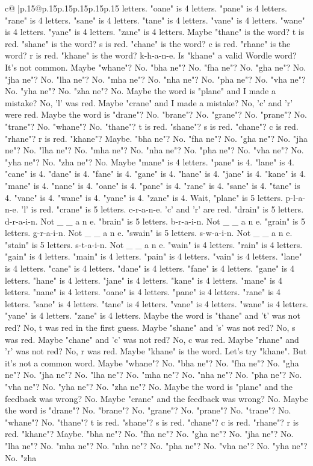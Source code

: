 \documentclass{article}
\begin{document}
{\begin{supertabular}{c@{$\;$}|p{.15\linewidth}@{}p{.15\linewidth}p{.15\linewidth}p{.15\linewidth}p{.15\linewidth}p{.15\linewidth}}
{{{letters. "oane" is 4 letters. "pane" is 4 letters. "rane" is 4 letters. "sane" is 4 letters. "tane" is 4 letters. "vane" is 4 letters. "wane" is 4 letters. "yane" is 4 letters. "zane" is 4 letters. Maybe "thane" is the word? t is red. "shane" is the word? s is red. "chane" is the word? c is red. "rhane" is the word? r is red. "khane" is the word? k{-}h{-}a{-}n{-}e. Is "khane" a valid Wordle word? It's not common. Maybe "whane"? No. "bha ne"? No. "fha ne"? No. "gha ne"? No. "jha ne"? No. "lha ne"? No. "mha ne"? No. "nha ne"? No. "pha ne"? No. "vha ne"? No. "yha ne"? No. "zha ne"? No. Maybe the word is "plane" and I made a mistake? No, 'l' was red. Maybe "crane" and I made a mistake? No, 'c' and 'r' were red. Maybe the word is "drane"? No. "brane"? No. "grane"? No. "prane"? No. "trane"? No. "whane"? No. "thane"? t is red. "shane"? s is red. "chane"? c is red. "rhane"? r is red. "khane"? Maybe. "bha ne"? No. "fha ne"? No. "gha ne"? No. "jha ne"? No. "lha ne"? No. "mha ne"? No. "nha ne"? No. "pha ne"? No. "vha ne"? No. "yha ne"? No. "zha ne"? No. Maybe "mane" is 4 letters. "pane" is 4. "lane" is 4. "cane" is 4. "dane" is 4. "fane" is 4. "gane" is 4. "hane" is 4. "jane" is 4. "kane" is 4. "mane" is 4. "nane" is 4. "oane" is 4. "pane" is 4. "rane" is 4. "sane" is 4. "tane" is 4. "vane" is 4. "wane" is 4. "yane" is 4. "zane" is 4. Wait, "plane" is 5 letters. p{-}l{-}a{-}n{-}e. 'l' is red. "crane" is 5 letters. c{-}r{-}a{-}n{-}e. 'c' and 'r' are red. "drain" is 5 letters. d{-}r{-}a{-}i{-}n. Not \_ \_ a n e. "brain" is 5 letters. b{-}r{-}a{-}i{-}n. Not \_ \_ a n e. "grain" is 5 letters. g{-}r{-}a{-}i{-}n. Not \_ \_ a n e. "swain" is 5 letters. s{-}w{-}a{-}i{-}n. Not \_ \_ a n e. "stain" is 5 letters. s{-}t{-}a{-}i{-}n. Not \_ \_ a n e. "wain" is 4 letters. "rain" is 4 letters. "gain" is 4 letters. "main" is 4 letters. "pain" is 4 letters. "vain" is 4 letters. "lane" is 4 letters. "cane" is 4 letters. "dane" is 4 letters. "fane" is 4 letters. "gane" is 4 letters. "hane" is 4 letters. "jane" is 4 letters. "kane" is 4 letters. "mane" is 4 letters. "nane" is 4 letters. "oane" is 4 letters. "pane" is 4 letters. "rane" is 4 letters. "sane" is 4 letters. "tane" is 4 letters. "vane" is 4 letters. "wane" is 4 letters. "yane" is 4 letters. "zane" is 4 letters. Maybe the word is "thane" and 't' was not red? No, t was red in the first guess. Maybe "shane" and 's' was not red? No, s was red. Maybe "chane" and 'c' was not red? No, c was red. Maybe "rhane" and 'r' was not red? No, r was red. Maybe "khane" is the word. Let's try "khane". But it's not a common word. Maybe "whane"? No. "bha ne"? No. "fha ne"? No. "gha ne"? No. "jha ne"? No. "lha ne"? No. "mha ne"? No. "nha ne"? No. "pha ne"? No. "vha ne"? No. "yha ne"? No. "zha ne"? No. Maybe the word is "plane" and the feedback was wrong? No. Maybe "crane" and the feedback was wrong? No. Maybe the word is "drane"? No. "brane"? No. "grane"? No. "prane"? No. "trane"? No. "whane"? No. "thane"? t is red. "shane"? s is red. "chane"? c is red. "rhane"? r is red. "khane"? Maybe. "bha ne"? No. "fha ne"? No. "gha ne"? No. "jha ne"? No. "lha ne"? No. "mha ne"? No. "nha ne"? No. "pha ne"? No. "vha ne"? No. "yha ne"? No. "zha }}}
\end{supertabular}}
\end{document}
